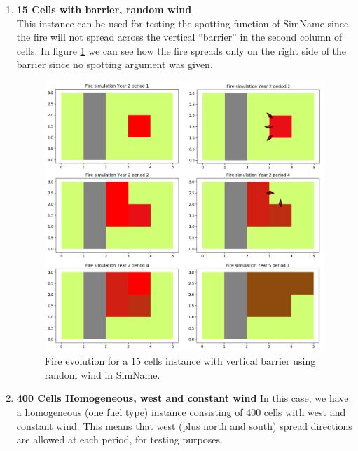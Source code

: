 \documentclass[11pt]{article}
\begin{document}
\begin{enumerate}
\newpage 

	\item \textbf{15 Cells with barrier, random wind}\\
	This instance can be used for testing the spotting function of SimName since the fire will not spread across the vertical ``barrier'' in the second column of cells. In figure \ref{Barrier15} we can see how the fire spreads only on the right side of the barrier since no spotting argument was given.
	
\begin{figure}[h!]
\includegraphics[scale=0.5]{15CellsRnd.png}
\centering
\caption{\label{Barrier15} Fire evolution for a 15 cells instance with vertical barrier using random wind in SimName.}
\end{figure}

\newpage

	\item \textbf{400 Cells Homogeneous, west and constant wind}
	In this case, we have a homogeneous (one fuel type) instance consisting of 400 cells with west and constant wind. This means that west (plus north and south) spread directions are allowed at each period, for testing purposes.
	

\end{enumerate}
\end{document}
